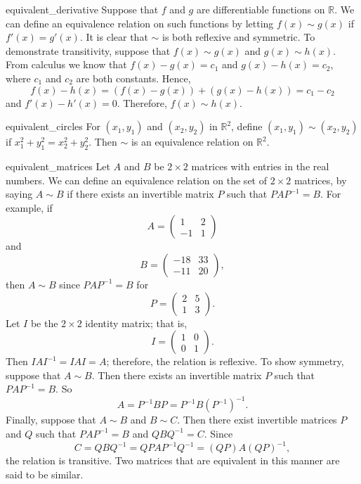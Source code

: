 \begin{example}{equivalent_derivative}
Suppose that $f$ and $g$ are differentiable functions on ${\mathbb R}$.  We can define an equivalence relation on such functions by letting $f(x) \sim g(x)$ if $f'(x) = g'(x)$. It is clear that $\sim$ is both reflexive and symmetric.  To demonstrate transitivity, suppose that $f(x) \sim g(x)$ and  $g(x) \sim h(x)$.  From calculus we know that $f(x) - g(x) = c_1$ and $g(x)- h(x) = c_2$, where $c_1$ and $c_2$ are both constants. Hence, 
$$
f(x) - h(x) = ( f(x) - g(x)) + ( g(x)- h(x))  = c_1 - c_2
$$
and $f'(x) - h'(x) =0$. Therefore, $f(x) \sim h(x)$.
\end{example}

\begin{example}{equivalent_circles}
For $(x_1, y_1 )$ and $(x_2, y_2)$ in ${\mathbb R}^2$, define $(x_1, y_1 ) \sim (x_2, y_2)$ if $x_1^2 + y_1^2 = x_2^2 + y_2^2$.  Then $\sim$ is an equivalence relation on ${\mathbb R}^2$.
\end{example}

\begin{example}{equivalent_matrices}
Let $A$ and $B$ be \mbox{$2 \times 2$} matrices with entries in the real numbers. We can define an equivalence relation on the set of $2 \times 2$ matrices, by saying $A \sim B$ if there exists an invertible matrix $P$ such that $PAP^{-1} = B$.  For example, if 
$$
A =
\begin{pmatrix}
1 & 2 \\
-1 & 1
\end{pmatrix}
$$
and
$$
B =
\begin{pmatrix}
-18 & 33 \\
-11 & 20
\end{pmatrix},
$$
then $A \sim B$ since $PAP^{-1} = B$ for
$$
P =
\begin{pmatrix}
2 & 5 \\
1 & 3
\end{pmatrix}.
$$
Let $I$ be the $2 \times 2$ identity matrix; that is,
$$
I =
\begin{pmatrix}
1 & 0 \\
0 & 1
\end{pmatrix}.
$$
Then $IAI^{-1} = IAI = A$; therefore, the relation is reflexive.  To show symmetry, suppose that $A \sim B$.  Then there exists an invertible matrix $P$ such that $PAP^{-1} = B$.  So 
$$
A = P^{-1} B P = P^{-1} B (P^{-1})^{-1}.
$$
Finally, suppose that $A \sim B$ and $B \sim C$.  Then there exist invertible matrices $P$ and $Q$ such that $PAP^{-1} = B$ and  $QBQ^{-1} = C$.  Since 
$$
C = QBQ^{-1} = QPAP^{-1} Q^{-1} = (QP)A(QP)^{-1},
$$
the relation is transitive.  Two matrices that are equivalent in this manner are said to be {\bfi similar}. 
\end{example}


